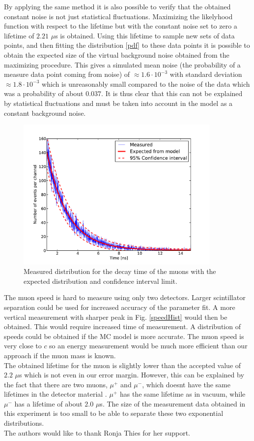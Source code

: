 \documentclass[10pt,twocolumn]{article}
\begin{document}
By applying the same method it is also possible to verify that the obtained constant noise is not just statistical fluctuations. Maximizing the likelyhood function with respect to the lifetime but with the constant noise set to zero a lifetime of $2.21$ $\mu$s is obtained. Using this lifetime to sample new sets of data points, and then fitting the distribution \eqref{pdf} to these data points it is possible to obtain the expected size of the virtual background noise obtained from the maximizing procedure. This gives a simulated mean noise (the probability of a measure data point coming from noise) of $\approx1.6\cdot 10^{-3}$ with standard deviation $\approx1.8\cdot 10^{-3}$ which is unreasonably small compared to the noise of the data which was a probability of about $0.037$. It is thus clear that this can not be explained by statistical fluctuations and must be taken into account in the model as a constant background noise. 
\begin{figure}
\centering
\includegraphics[width=10cm]{lifetimeSpectrum.pdf}
\caption{Measured distribution for the decay time of the muons with the expected distribution and confidence interval limit.}
\label{lifetime}
\end{figure}
The muon speed is hard to measure using only two detectors. Larger scintillator separation could be used for increased accuracy of the parameter fit. A more vertical measurement with sharper peak in Fig. \ref{speedHist} would then be obtained. This would require increased time of measurement. A distribution of speeds could be obtained if the MC model is more accurate. The muon speed is very close to $c$ so an energy measurement would be much more efficient than our approach if the muon mass is known.\\

The obtained lifetime for the muon is slightly lower than the accepted value of $2.2$ $\mu$s which is not even in our error margin. However, this can be explained by the fact that there are two muons, $\mu^+$ and $\mu^-$, which doesnt have the same lifetimes in the detector material \cite{}. $\mu^+$ has the same lifetime as in vacuum, while $\mu^-$ has a lifetime of about $2.0$ $\mu$s. The size of the measurement data obtained in this experiment is too small to be able to separate these two exponential distributions.\\

The authors would like to thank Ronja Thies for her support.





\end{document}
